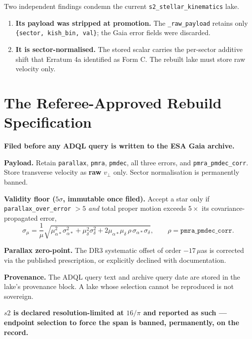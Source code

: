 \documentclass[11pt, letterpaper, openany]{book}
\begin{document}
Two independent findings condemn the current \texttt{s2\_stellar\_kinematics} lake.

\begin{enumerate}
    \item \textbf{Its payload was stripped at promotion.} The \texttt{\_raw\_payload} retains only
          \texttt{\{sector, kish\_bin, val\}}; the Gaia error fields were discarded. 
    \item \textbf{It is sector-normalised.} The stored scalar carries the per-sector additive shift
          that Erratum 4a identified as Form C. The rebuilt lake must store raw velocity only.
\end{enumerate}

\section{The Referee-Approved Rebuild Specification}

\begin{predictionbox}
\textbf{Filed before any ADQL query is written to the ESA Gaia archive.}

\medskip
\textbf{Payload.} Retain \texttt{parallax}, \texttt{pmra}, \texttt{pmdec}, all three errors, and
\texttt{pmra\_pmdec\_corr}. Store transverse velocity as \textbf{raw} $v_\perp$ only. Sector
normalisation is permanently banned.

\medskip
\textbf{Validity floor ($5\sigma$, immutable once filed).} Accept a star only if
\texttt{parallax\_over\_error} $> 5$ \emph{and} total proper motion exceeds $5\times$ its
covariance-propagated error,
\[
\sigma_\mu = \frac{1}{\mu}\sqrt{\mu_{\alpha*}^2\sigma_{\alpha*}^2 + \mu_\delta^2\sigma_\delta^2
+ 2\mu_{\alpha*}\mu_\delta\,\rho\,\sigma_{\alpha*}\sigma_\delta},
\qquad \rho = \texttt{pmra\_pmdec\_corr}.
\]

\medskip
\textbf{Parallax zero-point.} The DR3 systematic offset of order $-17\,\mu$as is corrected via the
published prescription, or explicitly declined with documentation. 

\medskip
\textbf{Provenance.} The ADQL query text and archive query date are stored in the lake's
provenance block. A lake whose selection cannot be reproduced is not sovereign.
\end{predictionbox}

\begin{rulingbox}
\textbf{$s2$ is declared resolution-limited at $16/\pi$ and reported as such --- endpoint selection
to force the span is banned, permanently, on the record.} 
\end{rulingbox}
\end{document}
